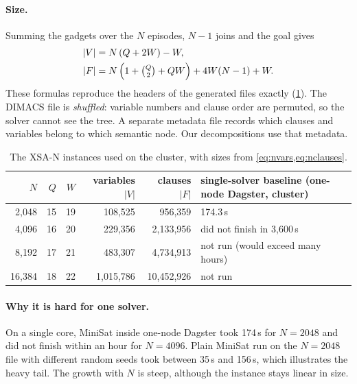 \documentclass[11pt,a4paper]{article}
\newcommand{\XSA}{\textsf{XSA-N}}
\begin{document}
\paragraph{Size.}
Summing the gadgets over the $N$ episodes, $N-1$ joins and the goal gives
\begin{align}
|V| &= N\,(Q+2W) - W,\label{eq:nvars}\\
|F| &= N\left(1+\tbinom{Q}{2}+QW\right) + 4W(N-1) + W.\label{eq:nclauses}
\end{align}
These formulas reproduce the headers of the generated files exactly (\cref{tab:instances}).
The DIMACS file is \emph{shuffled}: variable numbers and clause order are permuted, so the
solver cannot see the tree. A separate metadata file records which clauses and variables
belong to which semantic node. Our decompositions use that metadata.

\begin{table}[htbp]
\centering\small
\begin{tabular}{@{}rrrrrl@{}}
\toprule
$N$ & $Q$ & $W$ & variables $|V|$ & clauses $|F|$ & single-solver baseline (one-node Dagster, cluster) \\
\midrule
2{,}048 & 15 & 19 & 108{,}525 & 956{,}359 & 174.3\,s \\
4{,}096 & 16 & 20 & 229{,}356 & 2{,}133{,}956 & did not finish in 3{,}600\,s \\
8{,}192 & 17 & 21 & 483{,}307 & 4{,}734{,}913 & not run (would exceed many hours) \\
16{,}384 & 18 & 22 & 1{,}015{,}786 & 10{,}452{,}926 & not run \\
\bottomrule
\end{tabular}
\caption{The \XSA{} instances used on the cluster, with sizes from \cref{eq:nvars,eq:nclauses}.}
\label{tab:instances}
\end{table}

\paragraph{Why it is hard for one solver.}
On a single core, MiniSat inside one-node Dagster took 174\,s for $N=2048$ and did not
finish within an hour for $N=4096$. Plain MiniSat run on the $N=2048$ file with different
random seeds took between 35\,s and 156\,s, which illustrates the heavy tail. The growth
with $N$ is steep, although the instance stays linear in size.
\end{document}
